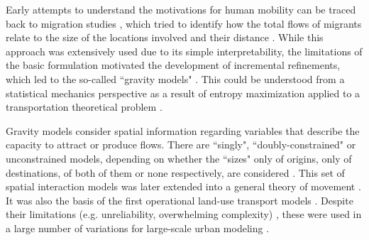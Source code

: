 Early attempts to understand the motivations for human mobility can be traced back to migration studies \citep{Ravenstein1885TheMigration}, which tried to identify how the total flows of migrants relate to the size of the locations involved and their distance
\citep{Erlander1990TheExtensions}. 
While this approach was extensively used due to its simple interpretability, the limitations of the basic formulation motivated the development of incremental refinements, which led to the so-called ``gravity models" \citep{Zipf1949HumanEffort., Simini2012APatterns}. %
This could be understood from a statistical mechanics perspective as a result of entropy maximization applied to a transportation theoretical problem \citep{Wilson1975SomeReview}. %

Gravity models consider spatial information regarding variables that describe the capacity to attract or produce flows. There are ``singly", ``doubly-constrained" or unconstrained models, depending on whether the ``sizes" only of origins, only of destinations, of both of them or none respectively, are considered \citep{Hayes1971SpatialInteraction, Fotheringham1989SpatialApplications, Wilson1975SomeReview}. %
This set of spatial interaction models was later extended into a general theory of movement \citep{Alonso1976AMovements, Fotheringham1984FurtherMovement}.  It was also the basis of the first operational land-use transport models \citep{Lowry1964}. Despite their limitations (e.g. unreliability, overwhelming complexity) \citep{Lee1973RequiemModels}, these were used in a large number of variations for large-scale urban modeling \citep{Wegener2021Land-UseModels, Iacono2008}.%

